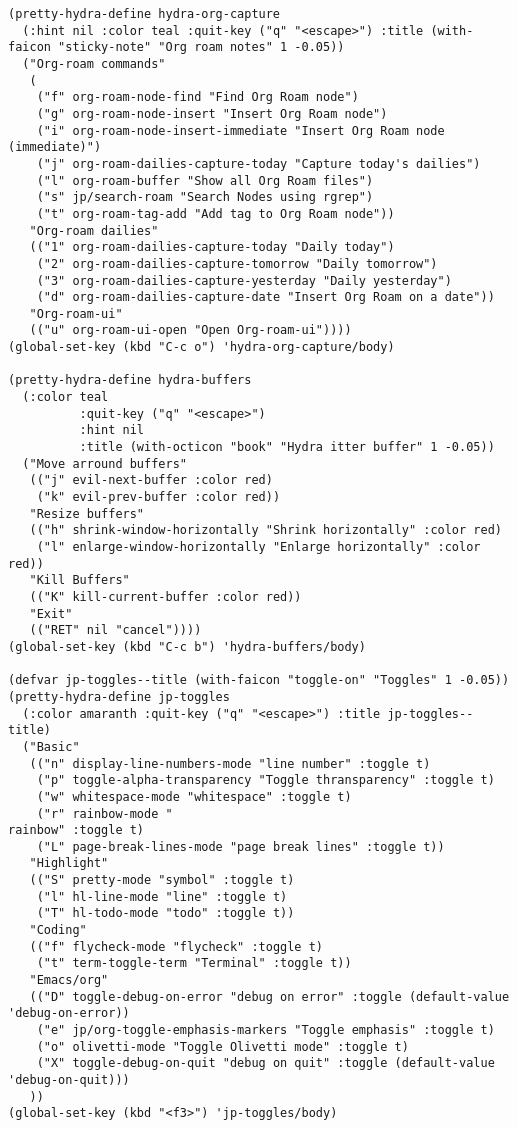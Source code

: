\documentclass[11pt]{article}
\begin{document}
\begin{verbatim}
(pretty-hydra-define hydra-org-capture
  (:hint nil :color teal :quit-key ("q" "<escape>") :title (with-faicon "sticky-note" "Org roam notes" 1 -0.05))
  ("Org-roam commands"
   (
    ("f" org-roam-node-find "Find Org Roam node")
    ("g" org-roam-node-insert "Insert Org Roam node")
    ("i" org-roam-node-insert-immediate "Insert Org Roam node (immediate)")
    ("j" org-roam-dailies-capture-today "Capture today's dailies")
    ("l" org-roam-buffer "Show all Org Roam files")
    ("s" jp/search-roam "Search Nodes using rgrep")
    ("t" org-roam-tag-add "Add tag to Org Roam node"))
   "Org-roam dailies"
   (("1" org-roam-dailies-capture-today "Daily today")
    ("2" org-roam-dailies-capture-tomorrow "Daily tomorrow")
    ("3" org-roam-dailies-capture-yesterday "Daily yesterday")
    ("d" org-roam-dailies-capture-date "Insert Org Roam on a date"))
   "Org-roam-ui"
   (("u" org-roam-ui-open "Open Org-roam-ui"))))
(global-set-key (kbd "C-c o") 'hydra-org-capture/body)

(pretty-hydra-define hydra-buffers
  (:color teal
          :quit-key ("q" "<escape>")
          :hint nil
          :title (with-octicon "book" "Hydra itter buffer" 1 -0.05))
  ("Move arround buffers"
   (("j" evil-next-buffer :color red)
    ("k" evil-prev-buffer :color red))
   "Resize buffers"
   (("h" shrink-window-horizontally "Shrink horizontally" :color red)
    ("l" enlarge-window-horizontally "Enlarge horizontally" :color red))
   "Kill Buffers"
   (("K" kill-current-buffer :color red))
   "Exit"
   (("RET" nil "cancel"))))
(global-set-key (kbd "C-c b") 'hydra-buffers/body)

(defvar jp-toggles--title (with-faicon "toggle-on" "Toggles" 1 -0.05))
(pretty-hydra-define jp-toggles
  (:color amaranth :quit-key ("q" "<escape>") :title jp-toggles--title)
  ("Basic"
   (("n" display-line-numbers-mode "line number" :toggle t)
    ("p" toggle-alpha-transparency "Toggle thransparency" :toggle t)
    ("w" whitespace-mode "whitespace" :toggle t)
    ("r" rainbow-mode "
rainbow" :toggle t)
    ("L" page-break-lines-mode "page break lines" :toggle t))
   "Highlight"
   (("S" pretty-mode "symbol" :toggle t)
    ("l" hl-line-mode "line" :toggle t)
    ("T" hl-todo-mode "todo" :toggle t))
   "Coding"
   (("f" flycheck-mode "flycheck" :toggle t)
    ("t" term-toggle-term "Terminal" :toggle t))
   "Emacs/org"
   (("D" toggle-debug-on-error "debug on error" :toggle (default-value 'debug-on-error))
    ("e" jp/org-toggle-emphasis-markers "Toggle emphasis" :toggle t)
    ("o" olivetti-mode "Toggle Olivetti mode" :toggle t)
    ("X" toggle-debug-on-quit "debug on quit" :toggle (default-value 'debug-on-quit)))
   ))
(global-set-key (kbd "<f3>") 'jp-toggles/body)


\end{verbatim}
\end{document}
